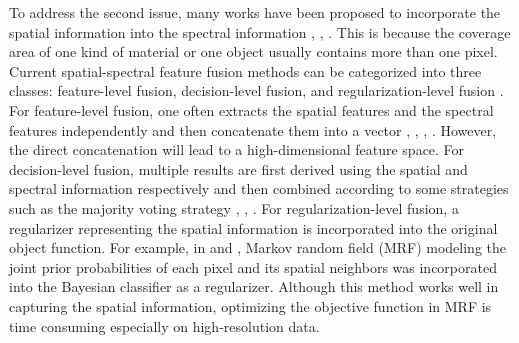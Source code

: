 \documentclass[12pt,onecolumn]{IEEEtran}
\begin{document}
\begin{spacing}{2}
To address the second issue, many works have been proposed to incorporate the spatial information into the spectral information \cite{Fauvel2013Advances}, \cite{Zhang2013Spatial}, \cite{Sun2015Supervised}. This is because the coverage area of one kind of material or one object usually contains more than one pixel. Current spatial-spectral feature fusion methods can be categorized into three classes: feature-level fusion, decision-level fusion, and regularization-level fusion \cite{Hang2015Matrix}. For feature-level fusion, one often extracts the spatial features and the spectral features independently and then concatenate them into a vector \cite{Zhang2012On}, \cite{Fauvel2008Spectral},  \cite{Mura2011Classification}, \cite{Benediktsson2005Classification}. However, the direct concatenation will lead to a high-dimensional feature space. For decision-level fusion, multiple results are first derived using the spatial and spectral information respectively and then combined according to some strategies such as the majority voting strategy \cite{Tarabalka2009Spectral}, \cite{Jimenez2005Integration}, \cite{Tarabalka2010Multiple}. For regularization-level fusion, a regularizer representing the spatial information is incorporated into the original object function. For example, in \cite{Jia2008Managing} and \cite{Jackson2002Adaptive}, Markov random field (MRF) modeling the joint prior probabilities of each pixel and its spatial neighbors was incorporated into the Bayesian classifier as a regularizer. Although this method works well in capturing the spatial information, optimizing the objective function in MRF is time consuming especially on high-resolution data.


\end{spacing}
\end{document}
